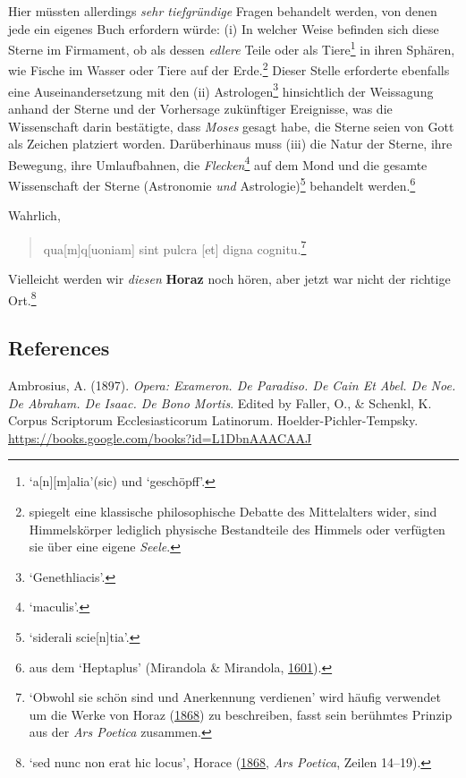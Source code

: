 \documentclass[
]{article}
\begin{document}
Hier müssten allerdings \emph{sehr tiefgründige} Fragen behandelt
werden, von denen jede ein eigenes Buch erfordern würde: (i) In welcher
Weise befinden sich diese Sterne im Firmament, ob als dessen
\emph{edlere} Teile oder als Tiere\footnote{`a{[}n{]}{[}m{]}alia'(sic)
  und `geschöpff'.} in ihren Sphären, wie Fische im Wasser oder Tiere
auf der Erde.\footnote{spiegelt eine klassische philosophische Debatte
  des Mittelalters wider, sind Himmelskörper lediglich physische
  Bestandteile des Himmels oder verfügten sie über eine eigene
  \emph{Seele}.} Dieser Stelle erforderte ebenfalls eine
Auseinandersetzung mit den (ii) Astrologen\footnote{`Genethliacis'.}
hinsichtlich der Weissagung anhand der Sterne und der Vorhersage
zukünftiger Ereignisse, was die Wissenschaft darin bestätigte, dass
\emph{Moses} gesagt habe, die Sterne seien von Gott als Zeichen
platziert worden. Darüberhinaus muss (iii) die Natur der Sterne, ihre
Bewegung, ihre Umlaufbahnen, die \emph{Flecken}\footnote{`maculis'.} auf
dem Mond und die gesamte Wissenschaft der Sterne (Astronomie \emph{und}
Astrologie)\footnote{`siderali scie{[}n{]}tia'.} behandelt
werden.\footnote{aus dem `Heptaplus' (Mirandola \& Mirandola,
  \href{https://doi.org/10.3931/e-rara-61217}{1601}).}

Wahrlich,

\begin{quote}
qua{[}m{]}q{[}uoniam{]} sint pulcra {[}et{]} digna cognitu.\footnote{`Obwohl
  sie schön sind und Anerkennung verdienen' wird häufig verwendet um die
  Werke von Horaz
  (\href{https://google.cat/books?id=A28VAAAAYAAJ}{1868}) zu
  beschreiben, fasst sein berühmtes Prinzip aus der \emph{Ars Poetica}
  zusammen.}
\end{quote}

Vielleicht werden wir \emph{diesen} \textbf{Horaz} noch hören, aber
jetzt war nicht der richtige Ort.\footnote{`sed nunc non erat hic
  locus', Horace (\href{https://google.cat/books?id=A28VAAAAYAAJ}{1868},
  \emph{Ars Poetica}, Zeilen 14--19).}

\hypertarget{references}{%
\subsection{References}\label{references}}

Ambrosius, A. (1897). \emph{Opera: Exameron. De Paradiso. De Cain Et
Abel. De Noe. De Abraham. De Isaac. De Bono Mortis}. Edited by Faller,
O., \& Schenkl, K. Corpus Scriptorum Ecclesiasticorum Latinorum.
Hoelder-Pichler-Tempsky.
\url{https://books.google.com/books?id=L1DbnAAACAAJ}
\end{document}
